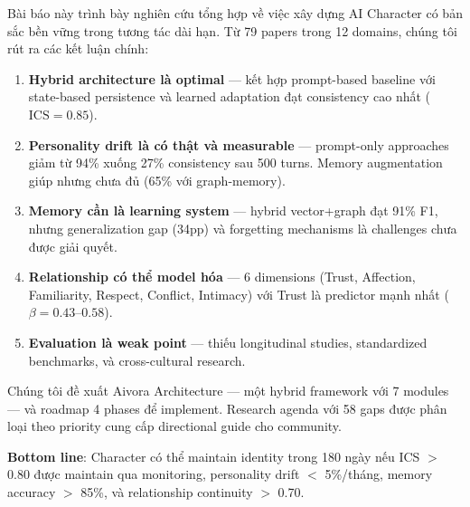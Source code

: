 \documentclass[10pt,leqno]{amsart}
\begin{document}
Bài báo này trình bày nghiên cứu tổng hợp về việc xây dựng AI Character có bản sắc bền vững trong tương tác dài hạn. Từ 79 papers trong 12 domains, chúng tôi rút ra các kết luận chính:

\begin{enumerate}
    \item \textbf{Hybrid architecture là optimal} --- kết hợp prompt-based baseline với state-based persistence và learned adaptation đạt consistency cao nhất ($\text{ICS}=0.85$).

    \item \textbf{Personality drift là có thật và measurable} --- prompt-only approaches giảm từ 94\% xuống 27\% consistency sau 500 turns. Memory augmentation giúp nhưng chưa đủ (65\% với graph-memory).

    \item \textbf{Memory cần là learning system} --- hybrid vector+graph đạt 91\% F1, nhưng generalization gap (34pp) và forgetting mechanisms là challenges chưa được giải quyết.

    \item \textbf{Relationship có thể model hóa} --- 6 dimensions (Trust, Affection, Familiarity, Respect, Conflict, Intimacy) với Trust là predictor mạnh nhất ($\beta=0.43$--$0.58$).

    \item \textbf{Evaluation là weak point} --- thiếu longitudinal studies, standardized benchmarks, và cross-cultural research.
\end{enumerate}

Chúng tôi đề xuất Aivora Architecture --- một hybrid framework với 7 modules --- và roadmap 4 phases để implement. Research agenda với 58 gaps được phân loại theo priority cung cấp directional guide cho community.

\textbf{Bottom line}: Character có thể maintain identity trong 180 ngày nếu ICS $>$ 0.80 được maintain qua monitoring, personality drift $<$ 5\%/tháng, memory accuracy $>$ 85\%, và relationship continuity $>$ 0.70.





\end{document}
